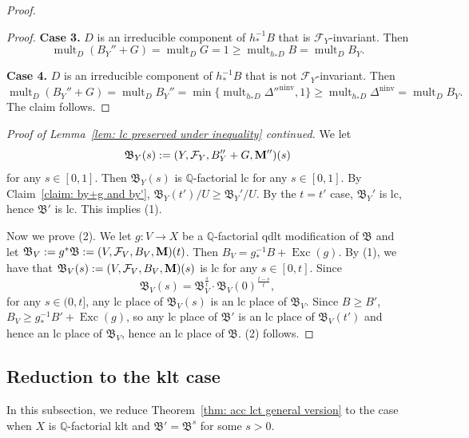 \documentclass[11pt,reqno]{amsart}
\numberwithin{equation}{section}
\newcommand{\Mm}{{\bf{M}}}
\newcommand{\Exc}{\operatorname{Exc}}
\newcommand{\ninv}{\operatorname{ninv}}
\newcommand{\mult}{\operatorname{mult}}
\newcommand{\Bb}{{\mathfrak{B}}}
\newcommand{\Ff}{\mathcal{F}}
\theoremstyle{definition}
\begin{document}
\begin{proof}
\begin{proof}
    \medskip

    \noindent\textbf{Case 3.} $D$ is an irreducible component of $h^{-1}_*B$ that is $\Ff_Y$-invariant. Then
$$\mult_D(B_Y''+G)=\mult_DG=1\geq\mult_{h_*D}B=\mult_DB_{Y}.$$

    \medskip

    \noindent\textbf{Case 4.} $D$ is an irreducible component of $h^{-1}_*B$ that is not $\Ff_Y$-invariant. Then
    $$\mult_D(B_Y''+G)=\mult_DB_Y''=\min\{\mult_{h_*D}\Delta''^{\ninv},1\}\geq\mult_{h_*D}\Delta^{\ninv}=\mult_DB_{Y}.$$
    The claim follows.
\end{proof}
\noindent\textit{Proof of Lemma~\ref{lem: lc preserved under inequality} continued.} We let
$$\Bb_Y(s):=(Y,\Ff_Y,B_Y''+G,\Mm'')(s)$$
for any $s\in [0,1]$. Then $\Bb_Y(s)$ is $\mathbb Q$-factorial lc for any $s\in [0,1]$. By Claim~\ref{claim: by+g and by'}, $\Bb_Y(t')/U\geq\Bb_Y'/U$. By the $t=t'$ case, $\Bb_{Y}'$ is lc, hence $\Bb'$ is lc. This implies (1).

Now we prove (2). We let $g: V\rightarrow X$ be a $\mathbb Q$-factorial qdlt modification of $\Bb$ and let $\Bb_V:=g^*\Bb:=(V,\Ff_V,B_V,\Mm)(t)$. Then $B_V=g^{-1}_*B+\Exc(g)$. By (1), we have that $\Bb_V(s):=(V,\Ff_V,B_V,\Mm)(s)$ is lc for any $s\in [0,t]$. Since
$$\Bb_V(s)=\Bb_V^{\frac{s}{t}}\cdot\Bb_V(0)^{\frac{t-s}{t}},$$
for any $s\in (0,t]$, any lc place of $\Bb_V(s)$ is an lc place of $\Bb_V$. Since $B\geq B'$, $B_V\geq g^{-1}_*B'+\Exc(g)$, so any lc place of $\Bb'$ is an lc place of $\Bb_V(t')$ and hence an lc place of $\Bb_V$, hence an lc place of $\Bb$. (2) follows.
\end{proof}

\subsection{Reduction to the klt case}

In this subsection, we reduce Theorem~\ref{thm: acc lct general version} to the case when $X$ is $\mathbb Q$-factorial klt and $\Bb'=\Bb^s$ for some $s>0$.
\end{document}

